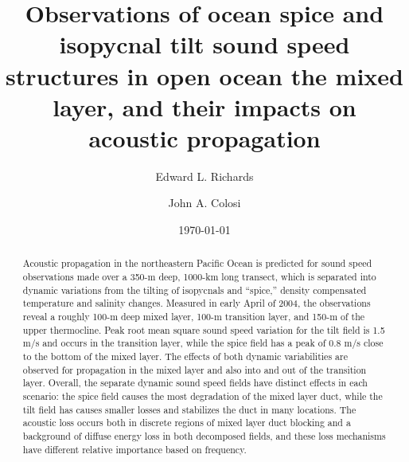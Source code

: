 \documentclass[preprint,NumberedRefs]{JASA}
\begin{document}
\title[Mixed layer tilt and spice]{Observations of ocean spice and isopycnal tilt sound speed structures in open ocean the mixed layer, and their impacts on acoustic propagation}
\author{Edward L. Richards}
\author{John A. Colosi}


\date{\today}

\begin{abstract}
Acoustic propagation in the northeastern Pacific Ocean is predicted for sound speed observations made over a 350-m deep, 1000-km long transect, which is separated into dynamic variations from the tilting of isopycnals and “spice,” density compensated temperature and salinity changes. Measured in early April of 2004, the observations reveal a roughly 100-m deep mixed layer, 100-m transition layer, and 150-m of the upper thermocline. Peak root mean square sound speed variation for the tilt field is 1.5 m/s and occurs in the transition layer, while the spice field has a peak of 0.8 m/s close to the bottom of the mixed layer. The effects of both dynamic variabilities are observed for propagation in the mixed layer and also into and out of the transition layer. Overall, the separate dynamic sound speed fields have distinct effects in each scenario: the spice field causes the most degradation of the mixed layer duct, while the tilt field has causes smaller losses and stabilizes the duct in many locations. The acoustic loss occurs both in discrete regions of mixed layer duct blocking and a background of diffuse energy loss in both decomposed fields, and these loss mechanisms have different relative importance based on frequency.
\end{abstract}

\maketitle
\end{document}
